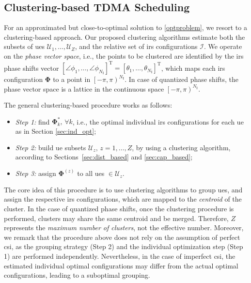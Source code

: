 \subsection{Clustering-based TDMA Scheduling}
\label{sec:clust_tdma}
For an approximated but close-to-optimal solution to \eqref{optproblem}, we resort to a clustering-based approach.
Our proposed clustering algorithms estimate both the subsets of \glspl{ue} $\mathcal{U}_1,\ldots,\mathcal{U}_{Z}$, and the relative set of \gls{irs} configurations $\mathcal{I}$.
We operate on the \textit{phase vector space}, i.e., the points to be clustered are identified by the \gls{irs} phase shifts vector $\left[\angle{\phi_{1}},\ldots,\angle{\phi_{N_{\mathrm I}}}\right]^{\mathrm T} = \left[\theta_{1},\ldots,\theta_{N_{\mathrm I}}\right]^{\mathrm T}$,
which maps each \gls{irs} configuration $\bm{\Phi}$ to a point in $\left[-\pi,\pi\right)^{N_{\mathrm I}}$.
In case of quantized phase shifts, the phase vector space is a lattice in the continuous space $\left[-\pi,\pi\right)^{N_{\mathrm I}}$.

The general clustering-based procedure works as follows:
\begin{itemize}
    \item \emph{Step 1:} find $\bm{\Phi}^*_k,\, \forall k$, i.e., the optimal individual \gls{irs} configurations for each \gls{ue} as in Section \ref{sec:ind_opt};
    \item \emph{Step 2:} build \gls{ue} subsets $\mathcal{U}_z, \, z = 1, \ldots, Z$, by using a clustering algorithm, according to Sections~\ref{sec:dist_based} and \ref{sec:cap_based};
    \item \emph{Step 3:} assign $\bm{\Phi}^{(z)}$ to all \glspl{ue} $\in\mathcal{U}_z$.
\end{itemize}

The core idea of this procedure is to use clustering algorithms to group \glspl{ue}, and assign the respective \gls{irs} configurations, which are mapped to the \textit{centroid} of the cluster. 
In the case of quantized phase shifts, once the clustering procedure is performed, clusters may share the same centroid and be merged. Therefore, $Z$ represents the \textit{maximum number of clusters}, not the effective number.
Moreover, we remark that the procedure above does not rely on the assumption of perfect \gls{csi}, as the grouping strategy (Step 2) and the individual optimization step (Step 1) are performed independently. Nevertheless, in the case of imperfect \gls{csi}, the estimated individual optimal configurations may differ from the actual optimal configurations, leading to a suboptimal grouping.

